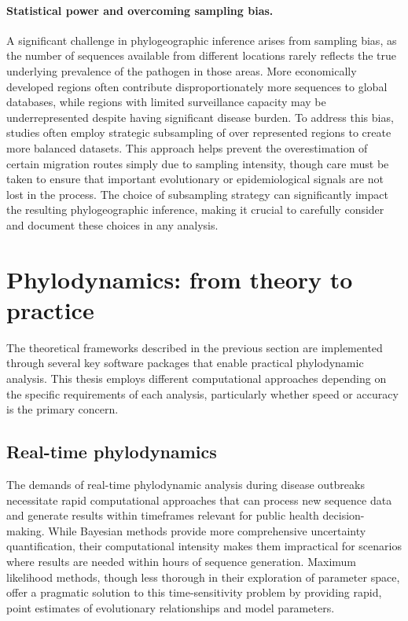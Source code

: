 \paragraph*{Statistical power and overcoming sampling bias.}
A significant challenge in phylogeographic inference arises from sampling bias, as the number of sequences available from different locations rarely reflects the true underlying prevalence of the pathogen in those areas.
More economically developed regions often contribute disproportionately more sequences to global databases, while regions with limited surveillance capacity may be underrepresented despite having significant disease burden.
To address this bias, studies often employ strategic subsampling of over represented regions to create more balanced datasets.
This approach helps prevent the overestimation of certain migration routes simply due to sampling intensity, though care must be taken to ensure that important evolutionary or epidemiological signals are not lost in the process.
The choice of subsampling strategy can significantly impact the resulting phylogeographic inference, making it crucial to carefully consider and document these choices in any analysis.

\section{Phylodynamics: from theory to practice}
The theoretical frameworks described in the previous section are implemented through several key software packages that enable practical phylodynamic analysis.
This thesis employs different computational approaches depending on the specific requirements of each analysis, particularly whether speed or accuracy is the primary concern.

\subsection{Real-time phylodynamics}
The demands of real-time phylodynamic analysis during disease outbreaks necessitate rapid computational approaches that can process new sequence data and generate results within timeframes relevant for public health decision-making.
While Bayesian methods provide more comprehensive uncertainty quantification, their computational intensity makes them impractical for scenarios where results are needed within hours of sequence generation.
Maximum likelihood methods, though less thorough in their exploration of parameter space, offer a pragmatic solution to this time-sensitivity problem by providing rapid, point estimates of evolutionary relationships and model parameters.

